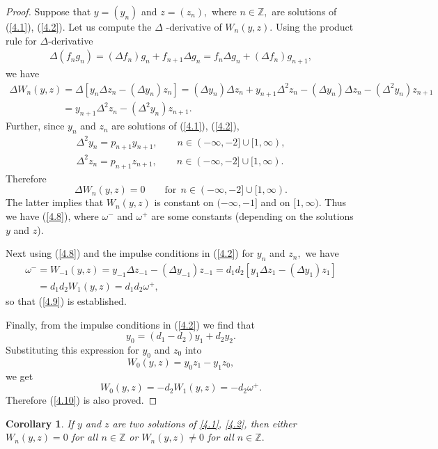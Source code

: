 \documentclass[11pt]{article}
\newtheorem{corollary}{Corollary}
\numberwithin{equation}{section}
\begin{document}
\begin{proof}
Suppose that $y=(y_{n})$ and $z=(z_{n}),$ where $n\in
\mathbb{Z}
,$ are solutions of (\ref{4.1}), (\ref{4.2}). Let us compute the $\Delta $%
-derivative of $W_{n}(y,z)$. Using the product rule for $\Delta $-derivative%
\begin{gather*}
\Delta (f_{n}g_{n}) = (\Delta f_{n})g_{n}+f_{n+1}\Delta g_{n}
= f_{n}\Delta g_{n}+(\Delta f_{n})g_{n+1},
\end{gather*}
we have
\begin{gather*}
\Delta W_{n}(y,z)=\Delta \left[ y_{n}\Delta z_{n}-(\Delta y_{n})z_{n}\right]
=(\Delta y_{n})\Delta z_{n}+y_{n+1}\Delta ^{2}z_{n}-(\Delta y_{n})\Delta
z_{n}-(\Delta ^{2}y_{n})z_{n+1}
\\
\phantom{\Delta W_{n}(y,z)}{}
=y_{n+1}\Delta ^{2}z_{n}-(\Delta ^{2}y_{n})z_{n+1}.
\end{gather*}
Further, since $y_{n}$ and $z_{n}$ are solutions of (\ref{4.1}), (\ref{4.2}),%
\begin{gather*}
\Delta ^{2}y_{n}=p_{n+1}y_{n+1},\qquad n\in (-\infty ,-2]\cup \lbrack
1,\infty ),
\\
\Delta ^{2}z_{n}=p_{n+1}z_{n+1},\qquad n\in (-\infty ,-2]\cup \lbrack
1,\infty ).
\end{gather*}
Therefore%
\[
\Delta W_{n}(y,z)=0\qquad \text{for} \ \ n\in (-\infty ,-2]\cup \lbrack
1,\infty ).
\]%
The latter implies that $W_{n}(y,z)$ is constant on $(-\infty ,-1]$ and on $%
[1,\infty ).$ Thus we have (\ref{4.8}), where $\omega ^{-}$ and $\omega ^{+}$
are some constants (depending on the solutions $y$ and $z$).

Next using (\ref{4.8}) and the impulse conditions in (\ref{4.2}) for $y_{n}$
and $z_{n},$ we have{\samepage
\begin{gather*}
\omega ^{-}=W_{-1}(y,z)=y_{-1}\Delta z_{-1}-(\Delta y_{-1})z_{-1}
=d_{1}d_{2}[y_{1}\Delta z_{1}-(\Delta
y_{1})z_{1}]\\
\phantom{\omega ^{-}}{} =d_{1}d_{2}W_{1}(y,z)=d_{1}d_{2}\omega ^{+},
\end{gather*}
so that (\ref{4.9}) is established.}

Finally, from the impulse conditions in (\ref{4.2}) we f\/ind that%
\[
y_{0}=(d_{1}-d_{2})y_{1}+d_{2}y_{2}.
\]%
Substituting this expression for $y_{0}$ and $z_{0}$ into
\[
W_{0}(y,z)=y_{0}z_{1}-y_{1}z_{0},
\]%
we get%
\[
W_{0}(y,z)=-d_{2}W_{1}(y,z)=-d_{2}\omega ^{+}.
\]%
Therefore (\ref{4.10}) is also proved.
\end{proof}

\begin{corollary}
\label{Cor4.4}If $y$ and $z$ are two solutions of \eqref{4.1}, \eqref{4.2},
then either $W_{n}(y,z)=0$ for all $n\in
\mathbb{Z}$ or $W_{n}(y,z)\neq 0$ for all $n\in
\mathbb{Z}.$
\end{corollary}
\end{document}
